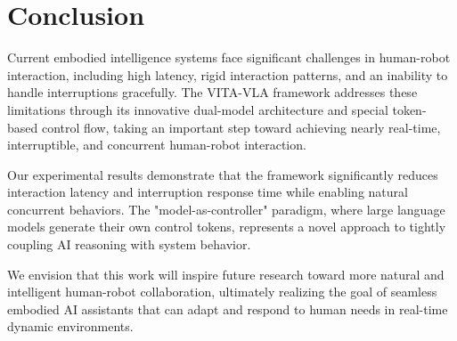 \section{Conclusion}
\label{sec:conclusion}


Current embodied intelligence systems face significant challenges in human-robot interaction, including high latency, rigid interaction patterns, and an inability to handle interruptions gracefully. The VITA-VLA framework addresses these limitations through its innovative dual-model architecture and special token-based control flow, taking an important step toward achieving nearly real-time, interruptible, and concurrent human-robot interaction.

Our experimental results demonstrate that the framework significantly reduces interaction latency and interruption response time while enabling natural concurrent behaviors. The "model-as-controller" paradigm, where large language models generate their own control tokens, represents a novel approach to tightly coupling AI reasoning with system behavior.

We envision that this work will inspire future research toward more natural and intelligent human-robot collaboration, ultimately realizing the goal of seamless embodied AI assistants that can adapt and respond to human needs in real-time dynamic environments.